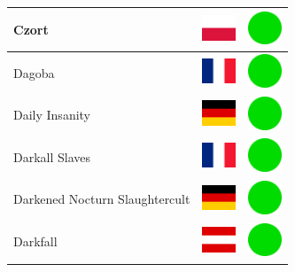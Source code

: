 \documentclass[12pt, a4paper, twoside]{report}
\begin{document}
\begin{center}
\begin{longtable}{|p{5cm}|p{2cm}|p{2cm}|}
 Czort                                                      & \includegraphics[width=1cm]{../4x3/pl} &   \includegraphics[width=1cm]{../likes/y} \\ \hline
 Dagoba                                                     & \includegraphics[width=1cm]{../4x3/fr} &   \includegraphics[width=1cm]{../likes/y} \\ \hline
 Daily Insanity                                             & \includegraphics[width=1cm]{../4x3/de} &   \includegraphics[width=1cm]{../likes/y} \\ \hline
 Darkall Slaves                                             & \includegraphics[width=1cm]{../4x3/fr} &   \includegraphics[width=1cm]{../likes/y} \\ \hline
 Darkened Nocturn Slaughtercult                             & \includegraphics[width=1cm]{../4x3/de} &   \includegraphics[width=1cm]{../likes/y} \\ \hline
 Darkfall                                                   & \includegraphics[width=1cm]{../4x3/at} &   \includegraphics[width=1cm]{../likes/y} \\ \hline

\end{longtable}
\end{center}
\end{document}
